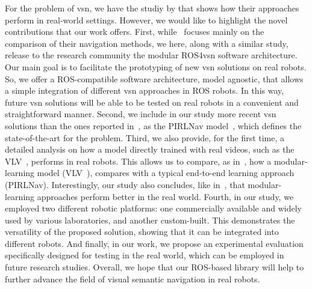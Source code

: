 For the problem of \acrshort{vsn}, we have the studiy by \cite{gervet2022} that shows how their approaches perform in real-world settings.
However, we would like to highlight the novel contributions that our work offers.
First, while~\cite{gervet2022} focuses mainly on the comparison of their navigation methods, we here, along with a similar study, release to the research community the modular ROS4\acrshort{vsn} software architecture.
Our main goal is to facilitate the prototyping of new \acrshort{vsn} solutions on real robots.
So, we offer a ROS-compatible software architecture, model agnostic, that allows a simple integration of different \acrshort{vsn} approaches in ROS robots.
In this way, future \acrshort{vsn} solutions will be able to be tested on real robots in a convenient and straightforward manner.
Second, we include in our study more recent \acrshort{vsn} solutions than the ones reported in~\cite{gervet2022}, as the PIRLNav model~\cite{ramrakhya2023}, which defines the state-of-the-art for the \objnav problem.
Third, we also provide, for the first time, a detailed analysis on how a model directly trained with real videos, such as the VLV~\cite{chang2020}, performs in real robots.
This allows us to compare, as in~\cite{gervet2022}, how a modular-learning model (\ie VLV~\cite{chang2020}), compares with a typical end-to-end learning approach (\ie PIRLNav).
Interestingly, our study also concludes, like in~\cite{gervet2022}, that modular-learning approaches perform better in the real world.
Fourth, in our study, we employed two different robotic platforms: one commercially available and widely used by various laboratories, and another custom-built.
This demonstrates the versatility of the proposed solution, showing that it can be integrated into different robots.
And finally, in our work, we propose an experimental evaluation specifically designed for testing in the real world, which can be employed in future research studies.
Overall, we hope that our ROS-based library will help to further advance the field of visual semantic navigation in real robots.
